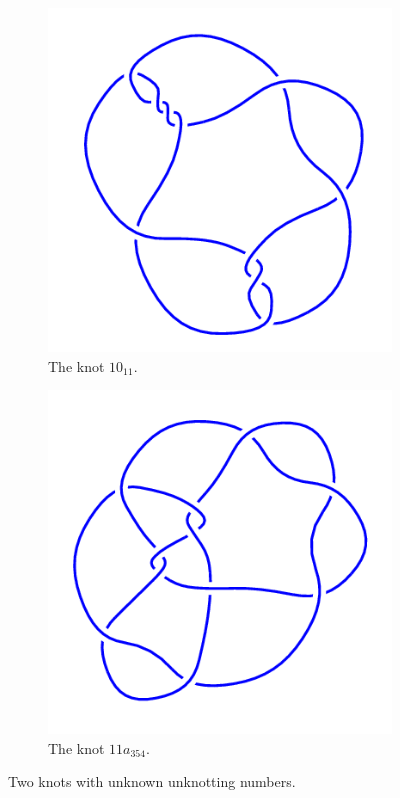 \documentclass[12pt,letterpaper]{article}
\theoremstyle{definition}
\begin{document}
\begin{figure}[h!]
    \centering
    \begin{subfigure}{.4\textwidth}
        \centering
        \includegraphics[width=\textwidth]{knotpics/10_11.png}
        \caption{The knot $10_{11}$.}
    \end{subfigure}
    \hspace{1cm}
    \begin{subfigure}{.4\textwidth}
        \centering
        \includegraphics[width=\textwidth]{knotpics/11a_354.png}
        \caption{The knot $11a_{354}$.}
    \end{subfigure}
    \caption{Two knots with unknown unknotting numbers.}
\end{figure}
\end{document}
